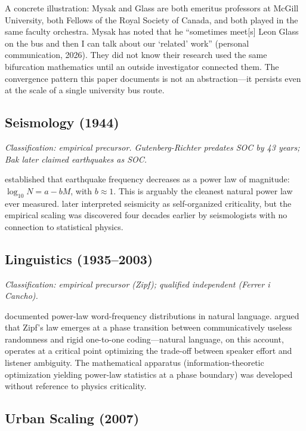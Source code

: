 \documentclass[11pt]{article}
\begin{document}
A concrete illustration: Mysak and Glass are both emeritus professors at McGill University, both Fellows of the Royal Society of Canada, and both played in the same faculty orchestra. Mysak has noted that he ``sometimes meet[s] Leon Glass on the bus and then I can talk about our `related' work'' (personal communication, 2026). They did not know their research used the same bifurcation mathematics until an outside investigator connected them. The convergence pattern this paper documents is not an abstraction---it persists even at the scale of a single university bus route.

\subsection{Seismology (1944)}

\noindent\textit{Classification: empirical precursor. Gutenberg-Richter predates SOC by 43 years; Bak later claimed earthquakes as SOC.}
\smallskip

\citet{gutenberg1944} established that earthquake frequency decreases as a power law of magnitude: $\log_{10} N = a - bM$, with $b \approx 1$. This is arguably the cleanest natural power law ever measured. \citet{bak_tang1989} later interpreted seismicity as self-organized criticality, but the empirical scaling was discovered four decades earlier by seismologists with no connection to statistical physics.

\subsection{Linguistics (1935--2003)}

\noindent\textit{Classification: empirical precursor (Zipf); qualified independent (Ferrer i Cancho).}
\smallskip

\citet{zipf1949} documented power-law word-frequency distributions in natural language. \citet{ferrer_cancho2003} argued that Zipf's law emerges at a phase transition between communicatively useless randomness and rigid one-to-one coding---natural language, on this account, operates at a critical point optimizing the trade-off between speaker effort and listener ambiguity. The mathematical apparatus (information-theoretic optimization yielding power-law statistics at a phase boundary) was developed without reference to physics criticality.

\subsection{Urban Scaling (2007)}
\end{document}
